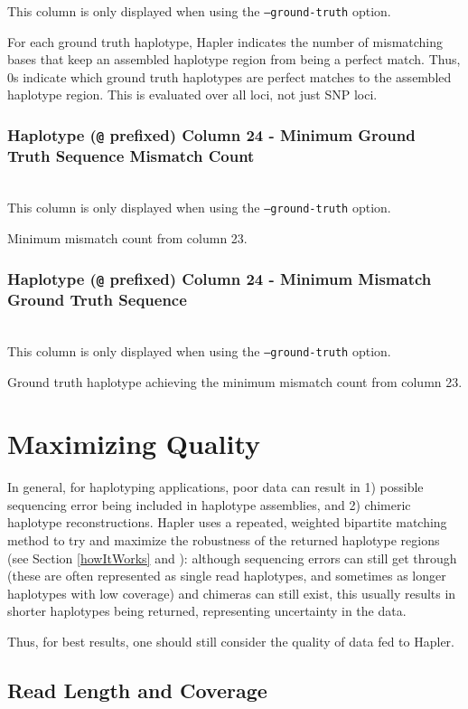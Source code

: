 \documentclass[11pt]{llncs}
\begin{document}
This column is only displayed when using the \texttt{--ground-truth} option.

For each ground truth haplotype, Hapler indicates the number of mismatching bases that keep an assembled haplotype region from being a perfect
match. Thus, 0s indicate which ground truth haplotypes are perfect matches to the assembled haplotype region. This is evaluated over all 
loci, not just SNP loci.


\subsubsection{Haplotype (\texttt{@} prefixed) Column 24 - Minimum Ground Truth Sequence Mismatch Count}
\ \\
This column is only displayed when using the \texttt{--ground-truth} option.

Minimum mismatch count from column 23.

\subsubsection{Haplotype (\texttt{@} prefixed) Column 24 - Minimum Mismatch Ground Truth Sequence}
\ \\
This column is only displayed when using the \texttt{--ground-truth} option.

Ground truth haplotype achieving the minimum mismatch count from column 23.

\newpage
\section{Maximizing Quality}
\label{maximizingQuality}

In general, for haplotyping applications, poor data can result in 1) possible sequencing error being included in haplotype
assemblies, and 2) chimeric haplotype reconstructions. 
Hapler uses a repeated, weighted bipartite matching method to try and maximize the robustness of the returned haplotype regions (see Section 
\ref{howItWorks} and \cite{ONEIL2011}): although sequencing errors can still get through (these are often represented as single read 
haplotypes, and sometimes as longer haplotypes with low coverage) and chimeras can still exist, this usually results in shorter haplotypes being returned,
representing uncertainty in the data.

Thus, for best results, one should still consider the quality of data fed to Hapler.

\subsection{Read Length and Coverage}
\end{document}
